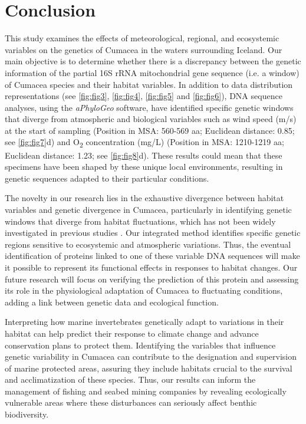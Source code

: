 \section{Conclusion}\label{conclusion}
This study examines the effects of meteorological, regional, and ecosystemic variables on the genetics of Cumacea in the waters surrounding Iceland. Our main objective is to determine whether there is a discrepancy between the genetic information of the partial 16S rRNA mitochondrial gene sequence (i.e. a window) of Cumacea species and their habitat variables. In addition to data distribution representations (see \autoref{fig:fig3}, \autoref{fig:fig4}, \autoref{fig:fig5} and \autoref{fig:fig6}), DNA sequence analyses, using the \textit{aPhyloGeo} software, have identified specific genetic windows that diverge from atmospheric and biological variables such as wind speed (m/s) at the start of sampling (Position in MSA: 560-569 aa; Euclidean distance: 0.85; see \autoref{fig:fig7}d) and O\textsubscript{2} concentration (mg/L) (Position in MSA: 1210-1219 aa; Euclidean distance: 1.23; see \autoref{fig:fig8}d). These results could mean that these specimens have been shaped by these unique local environments, resulting in genetic sequences adapted to their particular conditions.

The novelty in our research lies in the exhaustive divergence between habitat variables and genetic divergence in Cumacea, particularly in identifying genetic windows that diverge from habitat fluctuations, which has not been widely investigated in previous studies \citep{manel2003landscape, vrijenhoek2009cryptic}. Our integrated method identifies specific genetic regions sensitive to ecosystemic and atmospheric variations. Thus, the eventual identification of proteins linked to one of these variable DNA sequences will make it possible to represent its functional effects in responses to habitat changes. Our future research will focus on verifying the prediction of this protein and assessing its role in the physiological adaptation of Cumacea to fluctuating conditions, adding a link between genetic data and ecological function.

Interpreting how marine invertebrates genetically adapt to variations in their habitat can help predict their response to climate change and advance conservation plans to protect them. Identifying the variables that influence genetic variability in Cumacea can contribute to the designation and supervision of marine protected areas, assuring they include habitats crucial to the survival and acclimatization of these species. Thus, our results can inform the management of fishing and seabed mining companies by revealing ecologically vulnerable areas where these disturbances can seriously affect benthic biodiversity.

